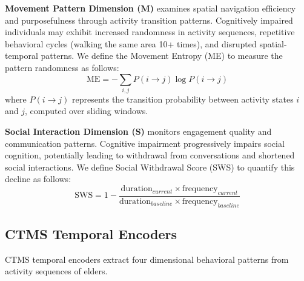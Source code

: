 \documentclass[sigconf, anonymous, 9pt, nonacm]{acmart}
\begin{document}
\noindent\textbf{Movement Pattern Dimension (M)} examines spatial navigation efficiency and purposefulness through activity transition patterns. Cognitively impaired individuals may exhibit increased randomness in activity sequences, repetitive behavioral cycles (walking the same area 10+ times), and disrupted spatial-temporal patterns.
We define the Movement Entropy (ME) to measure the pattern randomness as follows:
\begin{equation*}
\text{ME} = -\sum_{i,j} P(i \rightarrow j) \log P(i \rightarrow j)
\end{equation*}
where $P(i \rightarrow j)$ represents the transition probability between activity states $i$ and $j$, computed over sliding windows.

\noindent\textbf{Social Interaction Dimension (S)} monitors engagement quality and communication patterns. Cognitive impairment progressively impairs social cognition, potentially leading to withdrawal from conversations and shortened social interactions.
We define Social Withdrawal Score (SWS) to quantify this decline as follows:
\begin{equation*}
\text{SWS} = 1 - \frac{\text{duration}_{current} \times \text{frequency}_{current}}{\text{duration}_{baseline} \times \text{frequency}_{baseline}}
\end{equation*}





\subsection{CTMS Temporal Encoders}

CTMS temporal encoders extract four dimensional behavioral patterns from activity sequences of elders.
\end{document}
